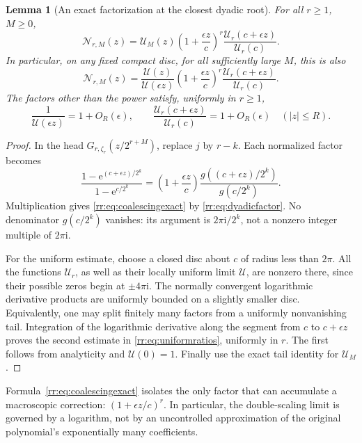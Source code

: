 \documentclass[11pt,a4paper,oneside,openany]{book}
\numberwithin{equation}{chapter}
\newtheorem{lemma}[theorem]{Lemma}
\theoremstyle{definition}
\theoremstyle{remark}
\newcommand{\e}{\mathrm e}
\newcommand{\ii}{\mathrm i}
\newcommand{\Up}{\mathcal U}
\newcommand{\Np}{\mathcal N}
\begin{document}
\begin{lemma}[An exact factorization at the closest dyadic root]
For all \(r\geq1\), \(M\geq0\),
\begin{equation}
 \Np_{r,M}(z)
 =\Up_M(z)\left(1+\frac{\epsilon z}{c}\right)^r
              \frac{\Up_r(c+\epsilon z)}{\Up_r(c)}.
 \label{rr:eq:coalescingexact}
\end{equation}
In particular, on any fixed compact disc, for all sufficiently large \(M\), this is also
\begin{equation}
 \Np_{r,M}(z)
 =\frac{\Up(z)}{\Up(\epsilon z)}
  \left(1+\frac{\epsilon z}{c}\right)^r
  \frac{\Up_r(c+\epsilon z)}{\Up_r(c)}.
 \label{rr:eq:coalescingquotient}
\end{equation}
The factors other than the power satisfy, uniformly in \(r\geq1\),
\begin{equation}
 \frac1{\Up(\epsilon z)}=1+O_R(\epsilon),\qquad
 \frac{\Up_r(c+\epsilon z)}{\Up_r(c)}=1+O_R(\epsilon)
 \quad (|z|\leq R).
 \label{rr:eq:uniformratios}
\end{equation}
\end{lemma}
\begin{proof}
In the head \(G_{r,\zeta_r}(z/2^{r+M})\), replace \(j\) by \(r-k\). Each normalized factor becomes
\[
 \frac{1-\e^{(c+\epsilon z)/2^k}}{1-\e^{c/2^k}}
 =\left(1+\frac{\epsilon z}{c}\right)
       \frac{g((c+\epsilon z)/2^k)}{g(c/2^k)}.
\]
Multiplication gives \eqref{rr:eq:coalescingexact} by \eqref{rr:eq:dyadicfactor}. No denominator \(g(c/2^k)\) vanishes: its argument is \(2\pi\ii/2^k\), not a nonzero integer multiple of \(2\pi\ii\).

For the uniform estimate, choose a closed disc about \(c\) of radius less than \(2\pi\). All the functions \(\Up_r\), as well as their locally uniform limit \(\Up\), are nonzero there, since their possible zeros begin at \(\pm4\pi\ii\). The normally convergent logarithmic derivative products are uniformly bounded on a slightly smaller disc. Equivalently, one may split finitely many factors from a uniformly nonvanishing tail. Integration of the logarithmic derivative along the segment from \(c\) to \(c+\epsilon z\) proves the second estimate in \eqref{rr:eq:uniformratios}, uniformly in \(r\). The first follows from analyticity and \(\Up(0)=1\). Finally use the exact tail identity for \(\Up_M\).
\end{proof}

Formula~\eqref{rr:eq:coalescingexact} isolates the only factor that can accumulate a macroscopic correction: \((1+\epsilon z/c)^r\). In particular, the double-scaling limit is governed by a logarithm, not by an uncontrolled approximation of the original polynomial's exponentially many coefficients.
\end{document}
